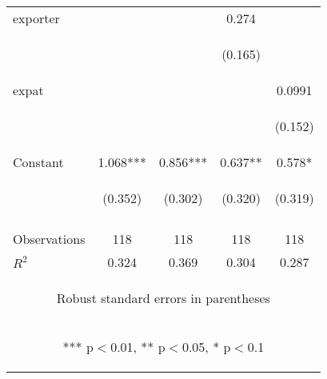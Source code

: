 \begin{center}
\begin{tabular}{lcccc}
exporter &  &  & 0.274 &  \\
\vspace{4pt} & \begin{footnotesize}\end{footnotesize} & \begin{footnotesize}\end{footnotesize} & \begin{footnotesize}(0.165)\end{footnotesize} & \begin{footnotesize}\end{footnotesize} \\
expat &  &  &  & 0.0991 \\
\vspace{4pt} & \begin{footnotesize}\end{footnotesize} & \begin{footnotesize}\end{footnotesize} & \begin{footnotesize}\end{footnotesize} & \begin{footnotesize}(0.152)\end{footnotesize} \\
Constant & 1.068*** & 0.856*** & 0.637** & 0.578* \\
 & \begin{footnotesize}(0.352)\end{footnotesize} & \begin{footnotesize}(0.302)\end{footnotesize} & \begin{footnotesize}(0.320)\end{footnotesize} & \begin{footnotesize}(0.319)\end{footnotesize} \\
\vspace{4pt} & \begin{footnotesize}\end{footnotesize} & \begin{footnotesize}\end{footnotesize} & \begin{footnotesize}\end{footnotesize} & \begin{footnotesize}\end{footnotesize} \\
Observations & 118 & 118 & 118 & 118 \\
 $R^2$ & 0.324 & 0.369 & 0.304 & 0.287 \\ \hline
\multicolumn{5}{c}{\begin{footnotesize} Robust standard errors in parentheses\end{footnotesize}} \\
\multicolumn{5}{c}{\begin{footnotesize} *** p$<$0.01, ** p$<$0.05, * p$<$0.1\end{footnotesize}} \\
\end{tabular}
\end{center}
